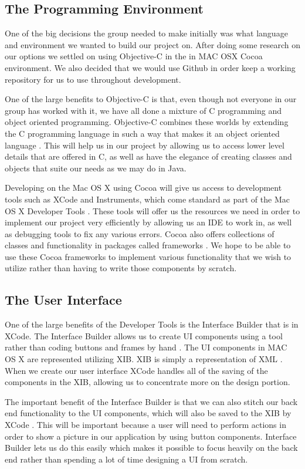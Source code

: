 \documentclass[11pt, a4paper,titlepage]{report}
\begin{document}
\subsection*{The Programming Environment}
One of the big decisions the group needed to make initially was what language and environment we wanted to build our project on. After doing some research on our options we settled on using Objective-C in the in MAC OSX Cocoa environment. We also decided that we would use Github in order keep a working repository for us to use throughout development.

One of the large benefits to Objective-C is that, even though not everyone in our group has worked with it, we have all done a mixture of C programming and object oriented programming. Objective-C combines these worlds by extending the C programming language in such a way that makes it an object oriented language \cite{Hillegass}. This will help us in our project by allowing us to access lower level details that are offered in C, as well as have the elegance of creating classes and objects that suite our needs as we may do in Java.

Developing on the Mac OS X using Cocoa will give us access to development tools such as XCode and Instruments, which come standard as part of the Mac OS X Developer Tools \cite{Hillegass}. These tools will offer us the resources we need in order to implement our project very efficiently by allowing us an IDE to work in, as well as debugging tools to fix any various errors. Cocoa also offers collections of classes and functionality in packages called frameworks \cite{Hillegass}. We hope to be able to use these Cocoa frameworks to implement various functionality that we wish to utilize rather than having to write those components by scratch.

\subsection*{The User Interface}
One of the large benefits of the Developer Tools is the Interface Builder that is in XCode. The Interface Builder allows us to create UI components using a tool rather than coding buttons and frames by hand \cite{Hillegass}. The UI components in MAC OS X are represented utilizing XIB. XIB is simply a representation of XML \cite{Hillegass}. When we create our user interface XCode handles all of the saving of the components in the XIB, allowing us to concentrate more on the design portion.

The important benefit of the Interface Builder is that we can also stitch our back end functionality to the UI components, which will also be saved to the XIB by XCode \cite{Hillegass}. This will be important because a user will need to perform actions in order to show a picture in our application by using button components. Interface Builder lets us do this easily which makes it possible to focus heavily on the back end rather than spending a lot of time designing a UI from scratch.
\end{document}
